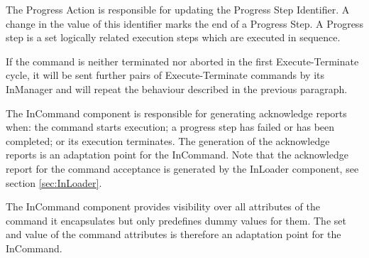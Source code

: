 The Progress Action is responsible for updating the Progress Step Identifier. A change in the value of this identifier marks the end of a Progress Step. A Progress step is a set logically related execution steps which are executed in sequence.

If the command is neither terminated nor aborted in the first Execute-Terminate cycle, it will be sent further pairs of Execute-Terminate commands by its InManager and will repeat the behaviour described in the previous paragraph.  

The InCommand component is responsible for generating acknowledge reports when: the command starts execution; a progress step has failed or has been completed; or its execution terminates. The generation of the acknowledge reports is an adaptation point for the InCommand. Note that the acknowledge report for the command acceptance is generated by the InLoader component, see section \ref{sec:InLoader}.

The InCommand component provides visibility over all attributes of the command it encapsulates but only predefines dummy values for them. The set and value of the command attributes is therefore an adaptation point for the InCommand.

